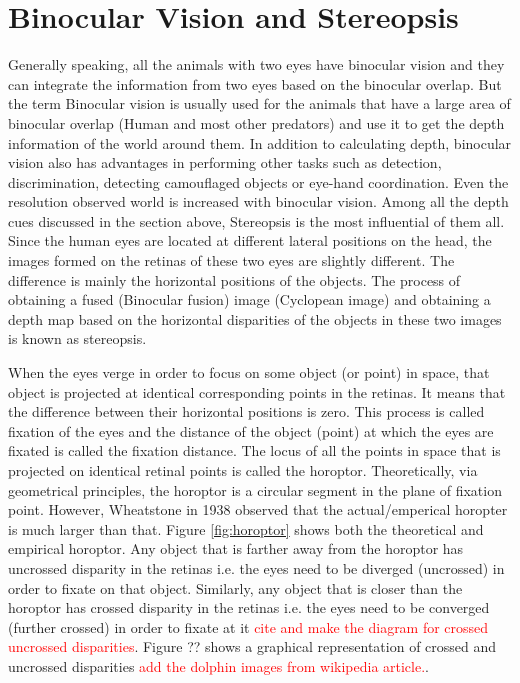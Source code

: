 \section{Binocular Vision and Stereopsis}
Generally speaking, all the animals with two eyes have binocular vision and they can integrate the information from two eyes based on the binocular overlap. But the term Binocular vision is usually used for the animals that have a large area of binocular overlap (Human and most other predators) and use it to get the depth information of the world around them. In addition to calculating depth, binocular vision also has advantages in performing other tasks such as detection, discrimination, detecting camouflaged objects or eye-hand coordination. Even the resolution observed world is increased with binocular vision\cite{howard1995binocular}. Among all the depth cues discussed in the section above, Stereopsis is the most influential of them all. Since the human eyes are located at different lateral positions on the head, the images formed on the retinas of these two eyes are slightly different. The difference is mainly the horizontal positions of the objects\cite{ wiki:stereopsis}. The process of obtaining a fused (Binocular fusion) image (Cyclopean image) and obtaining a depth map based on the horizontal disparities of the objects in these two images is known as stereopsis.

When the eyes verge in order to focus on some object (or point) in space, that object is projected at identical corresponding points in the retinas. It means that the difference between their horizontal positions is zero. This process is called fixation of the eyes and the distance of the object (point) at which the eyes are fixated is called the fixation distance. The locus of all the points in space that is projected on identical retinal points is called the horoptor\cite{ wiki:horoptor}. Theoretically, via geometrical principles, the horoptor is a circular segment in the plane of fixation point. However, Wheatstone in 1938 observed that the actual/emperical horopter is much larger than that. Figure \ref{fig:horoptor} shows both the theoretical and empirical horoptor. Any object that is farther away from the horoptor has uncrossed disparity in the retinas i.e. the eyes need to be diverged (uncrossed) in order to fixate on that object. Similarly, any object that is closer than the horoptor has crossed disparity in the retinas i.e. the eyes need to be converged (further crossed) in order to fixate at it \textcolor{red}{cite and make the diagram for crossed uncrossed disparities}. Figure ?? shows a graphical representation of crossed and uncrossed disparities \textcolor{red}{add the dolphin images from wikipedia article.}.

